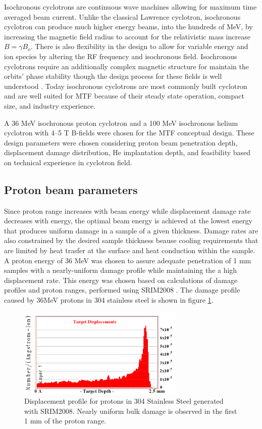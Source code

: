 \documentclass[final,3p,times,twocolumn]{elsarticle} %
\begin{document}
Isochronous cyclotrons are continuous wave machines allowing for maximum time averaged beam current.  Unlike the classical Lawrence cyclotron, isochronous cyclotron can produce much higher energy beams, into the hundreds of MeV, by increasing the magnetic field radius to account for the relativistic mass increase $B=\gamma B_o$.  There is also flexibility in the design to allow for variable energy and ion species by altering the RF frequency and isochronous field.  Isochronous cyclotrons require an additionally complex magnetic structure for maintain the orbits' phase stability though the design process for these fields is well understood \cite{strijckmans2001isochronous}. Today isochronous cyclotrons are most commonly built cyclotron and are well suited for MTF because of their steady state operation, compact size, and industry experience.

A 36 MeV isochronous proton cyclotron and a 100 MeV isochronous helium cyclotron with 4--5 T B-fields were chosen for the MTF conceptual design.  These design parameters were chosen considering proton beam penetration depth, displacement damage distribution, He implantation depth, and feasibility based on technical experience in cyclotron field. 

\subsection{Proton beam parameters}
Since proton range increases with beam energy while displacement damage rate decreases with energy, the optimal beam energy is achieved at the lowest energy that produces uniform damage in a sample of a given thickness.  Damage rates are also constrained by the desired sample thickness beause cooling requirements that are limited by heat trasfer at the surface and heat conduction within the sample. A proton energy of 36 MeV was chosen to assure adequate penetration of 1 mm samples with a nearly-uniform damage profile while maintaining the a high displacement rate.  This energy was chosen based on calculations of damage profiles and proton ranges, performed using SRIM2008 \cite{SRIM}.  The damage profile caused by 36MeV protons in 304 stainless steel is shown in figure \ref{fig:FeRange}.

\begin{figure}[htbp]
\begin{center}
\includegraphics[width=80mm]{Figures/FeRange.png}
\caption{Displacement profile for protons in 304 Stainless Steel generated with SRIM2008.  Nearly uniform bulk damage is observed in the first 1 mm of the proton range.}
\label{fig:FeRange}
\end{center}
\end{figure}
\end{document}
